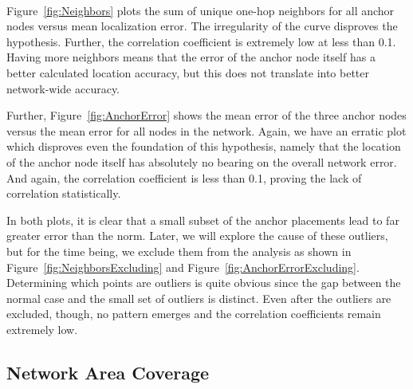 \begin{figure}
  \centering
	\\
	\label{}
	\caption{}
\end{figure}

Figure~\ref{fig:Neighbors} plots the sum of unique one-hop neighbors for all anchor nodes versus mean localization error.  The irregularity of the curve disproves the hypothesis. Further, the correlation coefficient is extremely low at less than 0.1. Having more neighbors means that the error of the anchor node itself has a better calculated location accuracy, but this does not translate into better network-wide accuracy.

Further, Figure~\ref{fig:AnchorError} shows the mean error of the three anchor nodes versus the mean error for all nodes in the network. Again, we have an erratic plot which disproves even the foundation of this hypothesis, namely that the location of the anchor node itself has absolutely no bearing on the overall network error. And again, the correlation coefficient is less than 0.1, proving the lack of correlation statistically.

In both plots, it is clear that a small subset of the anchor placements lead to far greater error than the norm.  Later, we will explore the cause of these outliers, but for the time being, we exclude them from the analysis as shown in Figure~\ref{fig:NeighborsExcluding} and Figure~\ref{fig:AnchorErrorExcluding}. Determining which points are outliers is quite obvious since the gap between the normal case and the small set of outliers is distinct. Even after the outliers are excluded, though, no pattern emerges and the correlation coefficients remain extremely low.

\subsection{Network Area Coverage}

